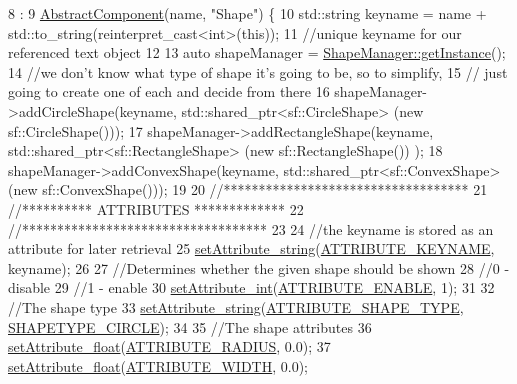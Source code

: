 \begin{DoxyCode}
8                                              :
9     \hyperlink{class_abstract_component_ab08b845eddbdbe411b95a5385501ab97}{AbstractComponent}(name, \textcolor{stringliteral}{"Shape"}) \{
10     std::string keyname = name + std::to\_string(reinterpret\_cast<int>(\textcolor{keyword}{this}));
11     \textcolor{comment}{//unique keyname for our referenced text object}
12 
13     \textcolor{keyword}{auto} shapeManager = \hyperlink{class_shape_manager_a94d827d6ef5cd970b05886b95fd32ece}{ShapeManager::getInstance}();
14     \textcolor{comment}{//we don't know what type of shape it's going to be, so to simplify,}
15     \textcolor{comment}{// just going to create one of each and decide from there}
16     shapeManager->addCircleShape(keyname, std::shared\_ptr<sf::CircleShape> (\textcolor{keyword}{new} sf::CircleShape()));
17     shapeManager->addRectangleShape(keyname, std::shared\_ptr<sf::RectangleShape> (\textcolor{keyword}{new} sf::RectangleShape())
      );
18     shapeManager->addConvexShape(keyname, std::shared\_ptr<sf::ConvexShape> (\textcolor{keyword}{new} sf::ConvexShape()));
19 
20     \textcolor{comment}{//***********************************}
21     \textcolor{comment}{//********** ATTRIBUTES *************}
22     \textcolor{comment}{//***********************************}
23 
24     \textcolor{comment}{//the keyname is stored as an attribute for later retrieval}
25     \hyperlink{class_abstract_component_a702ec2cc2624561ef51afcd9c8061fd2}{setAttribute\_string}(\hyperlink{_a_e___attributes_8h_a38d48cad306c55d90faa362aa5023de8}{ATTRIBUTE\_KEYNAME}, keyname);
26 
27     \textcolor{comment}{//Determines whether the given shape should be shown}
28         \textcolor{comment}{//0 - disable}
29         \textcolor{comment}{//1 - enable}
30     \hyperlink{class_abstract_component_aca84c14d196467bda6aff90521b1ae7f}{setAttribute\_int}(\hyperlink{_a_e___attributes_8h_a4c775095baf8a9c99621ad9ad3b622db}{ATTRIBUTE\_ENABLE}, 1);
31 
32     \textcolor{comment}{//The shape type}
33     \hyperlink{class_abstract_component_a702ec2cc2624561ef51afcd9c8061fd2}{setAttribute\_string}(\hyperlink{_a_e___attributes_8h_a4f8798cc305e537725c57bb8f47ba740}{ATTRIBUTE\_SHAPE\_TYPE}, 
      \hyperlink{_a_e___attributes_8h_ab5acdc705507cd35bfe5a25d403aaef7}{SHAPETYPE\_CIRCLE});
34 
35     \textcolor{comment}{//The shape attributes}
36     \hyperlink{class_abstract_component_aadaf9dfbb371db5fb21f9c7cf2cbea98}{setAttribute\_float}(\hyperlink{_a_e___attributes_8h_a5b0feddcf4ea3df07d1a9a2f9dd3bf70}{ATTRIBUTE\_RADIUS}, 0.0);
37     \hyperlink{class_abstract_component_aadaf9dfbb371db5fb21f9c7cf2cbea98}{setAttribute\_float}(\hyperlink{_a_e___attributes_8h_aade9a992cd068c12793a1bb56d015022}{ATTRIBUTE\_WIDTH}, 0.0);

\end{DoxyCode}

